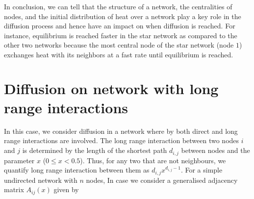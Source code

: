 \documentclass[10pt,a4paper]{article}
\begin{document}
In conclusion, we can tell that the structure of a network, the centralities of nodes, and the initial distribution of heat over a network play a key role in the diffusion process and hence have an impact on when diffusion is reached. For instance, equilibrium is reached faster in the star network as compared to the other two networks because the  most central node of the star network (node $1$) exchanges heat with its neighbors at a fast rate until equilibrium is reached.
  







%
\section{Diffusion on network with long range interactions}
In this case, we consider diffusion in a network where by both direct and long range interactions are involved. The long range interaction between two nodes $i$ and $j$ is determined by the length of the shortest path $d_{i,j}$ between nodes and the parameter $x$ ($0 \leq x < 0.5$). Thus, for any two that are not neighbours, we quantify long range interaction between them as $d_{i,j} x^{d_{i,j}-1}$.
For a simple undirected network with $n$ nodes,   
In case we consider a generalised adjacency matrix $A_{ij}(x)$ given by\\
\end{document}

